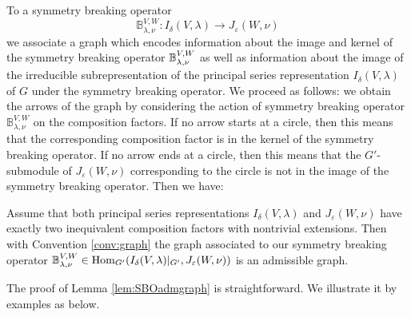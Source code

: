\bigskip



To a symmetry breaking operator 
\[{\mathbb B}^{V,W}_{\lambda,\nu}: I_\delta(V,\lambda) \rightarrow J_\varepsilon (W,\nu) \] 
we associate a graph
 which encodes information
 about the image and kernel of the symmetry breaking operator
 $\Bbb \lambda \nu {V,W}$
 as well as information about the image of the irreducible subrepresentation of the principal series representation
 $I_{\delta}(V,\lambda)$ of $G$
 under the symmetry breaking operator.  
We proceed as follows:
we obtain the arrows of the graph by considering the action of symmetry breaking operator ${\mathbb B}^{V,W}_{\lambda,\nu}$ on the composition factors. 
If no arrow starts at a circle, 
 then this means that the corresponding composition factor
 is in the kernel of the symmetry breaking operator. 
If no arrow ends at a circle,
 then this means
 that the $G'$-submodule
 of $J_{\varepsilon}(W,\nu)$ corresponding to the circle 
 is not in the image of the symmetry breaking operator. 
Then we have:
\begin{lemma}
\label{lem:SBOadmgraph}
Assume that both principal series representations
 $I_{\delta}(V,\lambda)$ and $J_{\varepsilon}(W,\nu)$
 have exactly two inequivalent composition factors
 with nontrivial extensions.  
Then with Convention \ref{conv:graph} the graph 
associated to our symmetry breaking operator
 $\Bbb \lambda \nu {V,W} \in {\operatorname{Hom}}_{G'}
(I_{\delta}(V,\lambda)|_{G'}, J_{\varepsilon}(W,\nu))$
 is an admissible graph.  
\end{lemma}
The proof of Lemma \ref{lem:SBOadmgraph} is straightforward.  
We illustrate it by examples as below.  
